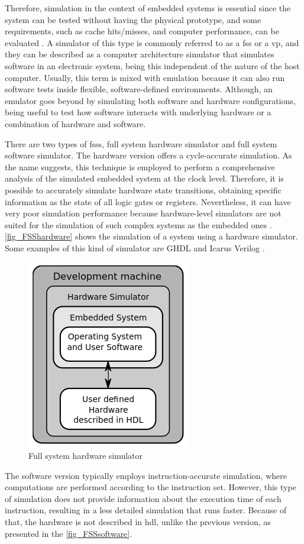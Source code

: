 Therefore, simulation in the context of embedded systems is essential since the system can be tested without having the physical prototype, and some requirements, such as cache hits/misses, and computer performance, can be evaluated \cite{pargem5}. A simulator of this type is commonly referred to as a \acrfull{fss} or a \acrfull{vp}, and they can be described as a computer architecture simulator that simulates software in an electronic system, being this independent of the nature of the host computer. Usually, this term is mixed with emulation because it can also run software tests inside flexible, software-defined environments. Although, an emulator goes beyond by simulating both software and hardware configurations, being useful to test how software interacts with underlying hardware or a combination of hardware and software.

There are two types of \glspl{fss}, full system hardware simulator and full system software simulator. The hardware version offers a cycle-accurate simulation. As the name suggests, this technique is employed to perform a comprehensive analysis of the simulated embedded system at the clock level. Therefore, it is possible to accurately simulate hardware state transitions, obtaining specific information as the state of all logic gates or registers. Nevertheless, it can have very poor simulation performance because hardware-level simulators are not suited for the simulation of such complex systems as the embedded ones \cite{TypesOfFSS}. \autoref{fig_FSShardware} shows the simulation of a system using a hardware simulator. Some examples of this kind of simulator are GHDL \cite{GHDLMainHomePage} and Icarus Verilog \cite{williams2002icarus}.

\begin{figure}[H]
	\centering
 	\includegraphics[width=0.3\linewidth]{Images/FSShardware.png}
 	\caption{Full system hardware simulator \cite{TypesOfFSS}}
	 \label{fig_FSShardware}
\end{figure}

The software version typically employs instruction-accurate simulation, where computations are performed according to the instruction set. However, this type of simulation does not provide information about the execution time of each instruction, resulting in a less detailed simulation that runs faster. Because of that, the hardware is not described in \gls{hdl}, unlike the previous version, as presented in the \autoref{fig_FSSsoftware}.

